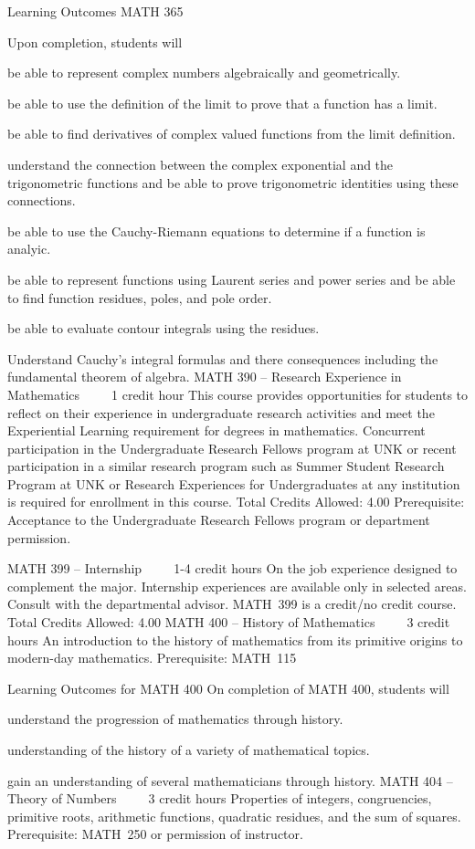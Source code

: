 Learning Outcomes MATH 365

Upon completion, students will 
    \item  be able to represent complex numbers algebraically and geometrically.
    \item be able to use the definition of the limit to prove that a function has a limit.
    \item be able to find derivatives of complex valued functions from the limit definition.
    \item understand the connection between the complex exponential and the trigonometric functions and be able to prove trigonometric identities using these connections.
    \item be able to use the Cauchy-Riemann equations to determine if a function is analyic.
    \item be able to represent functions using Laurent series and power series and be able to find function residues, poles, and pole order.
    \item be able to evaluate contour integrals using the residues.
    \item Understand Cauchy’s integral formulas and there consequences including the fundamental theorem of algebra.
MATH 390 – Research Experience in Mathematics     1 credit hour
This course provides opportunities for students to reflect on their experience in undergraduate research activities and meet the Experiential Learning requirement for degrees in mathematics. Concurrent participation in the Undergraduate Research Fellows program at UNK or recent participation in a similar research program such as Summer Student Research Program at UNK or Research Experiences for Undergraduates at any institution is required for enrollment in this course.
Total Credits Allowed: 4.00
Prerequisite: Acceptance to the Undergraduate Research Fellows program or department permission.


MATH 399 – Internship     1-4 credit hours
On the job experience designed to complement the major. Internship experiences are available only in selected areas. Consult with the departmental advisor. MATH 399 is a credit/no credit course.
Total Credits Allowed: 4.00
MATH 400 – History of Mathematics     3 credit hours
An introduction to the history of mathematics from its primitive origins to modern-day mathematics.
Prerequisite: MATH 115

Learning Outcomes for MATH 400
On completion of MATH 400, students will 
    \item understand the progression of mathematics through history.
    \item understanding of the history of a variety of mathematical topics.
    \item gain an understanding of several mathematicians through history.
MATH 404 – Theory of Numbers     3 credit hours
Properties of integers, congruencies, primitive roots, arithmetic functions, quadratic residues, and the sum of squares.
Prerequisite: MATH 250 or permission of instructor.

